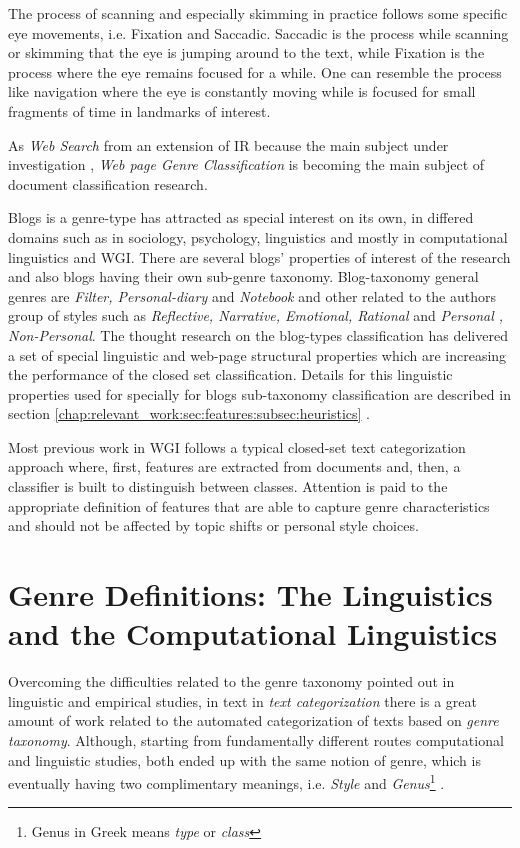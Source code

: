 The process of scanning and especially skimming in practice follows some specific eye movements, i.e. Fixation and Saccadic. Saccadic is the process while scanning or skimming that the eye is jumping around to the text, while Fixation is the process where the eye remains focused for a while. One can resemble the process like navigation where the eye is constantly moving while is focused for small fragments of time in landmarks of interest.
  
As \textit{Web Search} from an extension of IR because the main subject under investigation \parencite{manning2008introduction}, \textit{Web page Genre Classification } is becoming the main subject of document classification research.

Blogs is a genre-type has attracted as special interest on its own, in differed domains such as in sociology, psychology, linguistics and mostly in computational linguistics and WGI. There are several blogs' properties of interest of the research and  also blogs having their own sub-genre taxonomy. Blog-taxonomy general genres are \textit{Filter, Personal-diary} and \textit{Notebook} and other related to the authors group of styles such as \textit{Reflective, Narrative, Emotional, Rational} and \textit{Personal , Non-Personal}. The thought research on the blog-types classification has delivered a set of special linguistic and web-page structural properties which are increasing the performance of the closed set classification. Details for this linguistic properties used for specially for blogs sub-taxonomy classification are described in section \ref{chap:relevant_work:sec:features:subsec:heuristics} \parencite{virik2017blog,hoffmann2012cohesive,hoffmann2012cohesive,derczynski2014social,qu2006automated}. 

Most previous work in WGI follows a typical closed-set text categorization approach where, first, features are extracted from documents and, then, a classifier is built to distinguish between classes. Attention is paid to the appropriate definition of features that are able to capture genre characteristics and should not be affected by topic shifts or personal style choices. 

\section{Genre Definitions: The Linguistics and the Computational Linguistics}\label{chap:relevant_work:sec:definitions}

Overcoming the difficulties related to the genre taxonomy pointed out in linguistic and empirical studies, in text in \textit{text categorization} there is a great amount of work related to the automated categorization of texts based on \textit{genre taxonomy}. Although, starting from fundamentally different routes computational and linguistic studies, both ended up with the same notion of genre, which is eventually having two complimentary meanings,  i.e. \textit{Style} and \textit{Genus}\footnote{Genus in Greek means \textit{type} or \textit{class}} \parencite{sugiyanto2014term}. 

